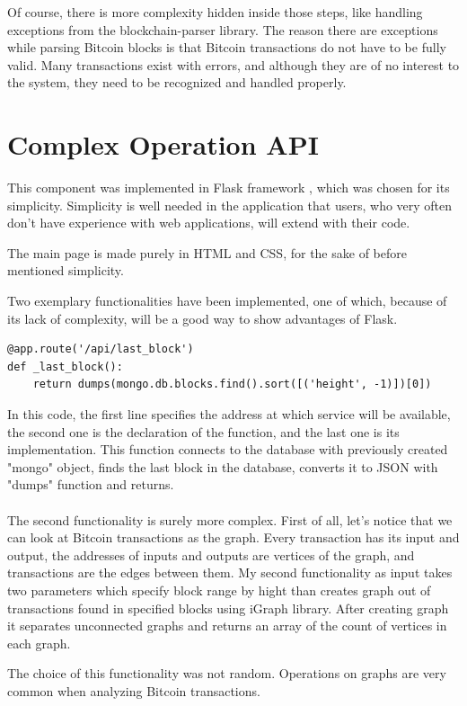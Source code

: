 \documentclass[12pt, en, eng, oneside, final]{mgr}
\begin{document}
Of course, there is more complexity hidden inside those steps, like handling exceptions from the blockchain-parser library. The reason there are exceptions while parsing Bitcoin blocks is that Bitcoin transactions do not have to be fully valid. Many transactions exist with errors, and although they are of no interest to the system, they need to be recognized and handled properly.

\section{Complex Operation API}
This component was implemented in Flask framework \cite{flask-web-page}, which was chosen for its simplicity. Simplicity is well needed in the application that users, who very often don't have experience with web applications, will extend with their code. 

The main page is made purely in HTML and CSS, for the sake of before mentioned simplicity.

Two exemplary functionalities have been implemented, one of which, because of its lack of complexity, will be a good way to show advantages of Flask.
\begin{lstlisting}[caption=API returning last block in blockchain]
@app.route('/api/last_block')
def _last_block():
    return dumps(mongo.db.blocks.find().sort([('height', -1)])[0])
\end{lstlisting}
In this code, the first line specifies the address at which service will be available, the second one is the declaration of the function, and the last one is its implementation. This function connects to the database with previously created "mongo" object, finds the last block in the database, converts it to JSON with "dumps" function and returns.
\\
\\
The second functionality is surely more complex. First of all, let's notice that we can look at Bitcoin transactions as the graph. Every transaction has its input and output, the addresses of inputs and outputs are vertices of the graph, and transactions are the edges between them. My second functionality as input takes two parameters which specify block range by hight than creates graph out of transactions found in specified blocks using iGraph \cite{igraph} library. After creating graph it separates unconnected graphs and returns an array of the count of vertices in each graph.

The choice of this functionality was not random. Operations on graphs are very common when analyzing Bitcoin transactions.
\end{document}

